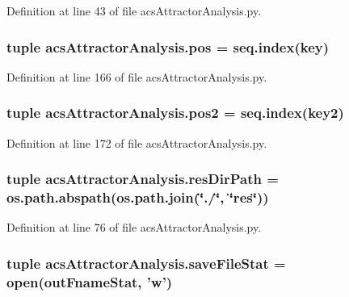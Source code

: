 Definition at line 43 of file acs\-Attractor\-Analysis.\-py.

\hypertarget{a00091_abae060beb170fe923fc10b75f9e82079}{
\subsubsection[{pos}]{\setlength{\rightskip}{0pt plus 5cm}tuple acs\-Attractor\-Analysis.\-pos = {\bf seq.\-index}(key)}}\label{a00091_abae060beb170fe923fc10b75f9e82079}


Definition at line 166 of file acs\-Attractor\-Analysis.\-py.

\hypertarget{a00091_a6ab79d8205f5d0ae2da47fb0af93149a}{
\subsubsection[{pos2}]{\setlength{\rightskip}{0pt plus 5cm}tuple acs\-Attractor\-Analysis.\-pos2 = {\bf seq.\-index}(key2)}}\label{a00091_a6ab79d8205f5d0ae2da47fb0af93149a}


Definition at line 172 of file acs\-Attractor\-Analysis.\-py.

\hypertarget{a00091_a35eb3b681c7408f1476b92798d4f2c16}{
\subsubsection[{res\-Dir\-Path}]{\setlength{\rightskip}{0pt plus 5cm}tuple acs\-Attractor\-Analysis.\-res\-Dir\-Path = os.\-path.\-abspath(os.\-path.\-join(\char`\"{}./\char`\"{}, \char`\"{}res\char`\"{}))}}\label{a00091_a35eb3b681c7408f1476b92798d4f2c16}


Definition at line 76 of file acs\-Attractor\-Analysis.\-py.

\hypertarget{a00091_acc1016f353d0e1b36c837cb0b480edef}{
\subsubsection[{save\-File\-Stat}]{\setlength{\rightskip}{0pt plus 5cm}tuple acs\-Attractor\-Analysis.\-save\-File\-Stat = open({\bf out\-Fname\-Stat}, 'w')}}\label{a00091_acc1016f353d0e1b36c837cb0b480edef}


